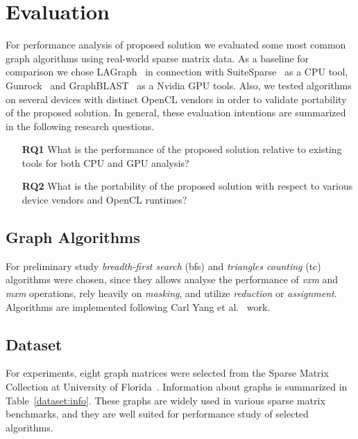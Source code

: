 \section{Evaluation}

For performance analysis of proposed solution we evaluated some most common graph algorithms using real-world sparse matrix data. As a baseline for comparison we chose LAGraph~\cite{szarnyas2021lagraph} in connection with SuiteSparse~\cite{10.1145/3322125} as a CPU tool, Gunrock~\cite{7967137} and GraphBLAST~\cite{yang2019graphblast} as a Nvidia GPU tools. Also, we tested algorithms on several devices with distinct OpenCL vendors in order to validate portability of the proposed solution. In general, these evaluation intentions are summarized in the following research questions. 

\vspace{0.2cm}
\begin{itemize}
    \item[\textbf{RQ1}] What is the performance of the proposed solution relative to existing tools for both CPU and GPU analysis?
    
    \item[\textbf{RQ2}] What is the portability of the proposed solution with respect to various device vendors and OpenCL runtimes?
\end{itemize}

\subsection{Graph Algorithms}

For preliminary study \textit{breadth-first search} (bfs) and \textit{triangles counting} (tc) algorithms were chosen, since they allows analyse the performance of \textit{vxm} and \textit{mxm} operations, rely heavily on \textit{masking}, and utilize \textit{reduction} or \textit{assignment}. Algorithms are implemented following Carl Yang et al.~\cite{yang2019graphblast} work.

\subsection{Dataset}

For experiments, eight graph matrices were selected from the Sparse Matrix Collection at University of Florida~\cite{dataset:10.1145/2049662.2049663}. Information about graphs is summarized in Table~\ref{dataset:info}. These graphs are widely used in various sparse matrix benchmarks, and they are well suited for performance study of selected algorithms.

